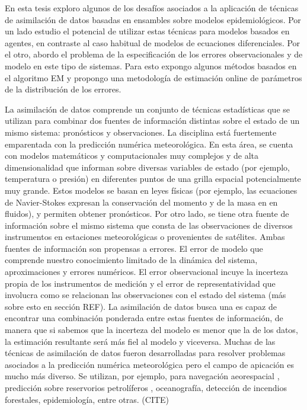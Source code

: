 En esta tesis exploro algunos de los desafíos asociados a la aplicación de técnicas de asimilación de datos basadas en ensambles sobre modelos epidemiológicos. Por un lado estudio el potencial de utilizar estas técnicas para modelos basados en agentes, en contraste al caso habitual de modelos de ecuaciones diferenciales. Por el otro, abordo el problema de la especificación de los errores observacionales y de modelo en este tipo de sistemas. Para esto expongo algunos métodos basados en el algoritmo EM y propongo una metodología de estimación online de parámetros de la distribución de los errores.

La asimilación de datos comprende un conjunto de técnicas estadísticas que se utilizan para combinar dos fuentes de información distintas sobre el estado de un mismo sistema: pronósticos y observaciones. La disciplina está fuertemente emparentada con la predicción numérica meteorológica. En esta área, se cuenta con modelos matemáticos y computacionales muy complejos y de alta dimensionalidad que informan sobre diversas variables de estado (por ejemplo, temperatura o presión) en diferentes puntos de una grilla espacial potencialmente muy grande. Estos modelos se basan en leyes físicas (por ejemplo, las ecuaciones de Navier-Stokes expresan la conservación del momento y de la masa en en fluidos), y permiten obtener pronósticos. Por otro lado, se tiene otra fuente de información sobre el mismo sistema que consta de las observaciones de diversos instrumentos en estaciones meteorológicas o provenientes de satélites. Ambas fuentes de información son propensas a errores. El error de modelo que comprende nuestro conocimiento limitado de la dinámica del sistema, aproximaciones y errores numéricos. El error observacional incuye la incerteza propia de los instrumentos de medición y el error de representatividad que involucra como se relacionan las observaciones con el estado del sistema (más sobre esto en sección REF). La asimilación de datos busca una es capaz de encontrar una combinación ponderada entre estas fuentes de información, de manera que si sabemos que la incerteza del modelo es menor que la de los datos, la estimación resultante será más fiel al modelo y viceversa. Muchas de las técnicas de asimilación de datos fueron desarrolladas para resolver problemas asociados a la predicción numérica meteorológica pero el campo de apicación es mucho más diverso. Se utilizan, por ejemplo, para navegación aeorespacial \cite{Grewal2010}, predicción sobre reservorios petrolíferos \cite{Aanonsen2009}, oceanografía, detección de incendios forestales, epidemiología, entre otras. (CITE)

